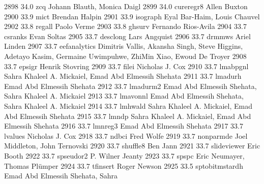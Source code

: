   2898     34.0    zcq           Johann Blauth, Monica Daigl             
  2899     34.0    cureregr8     Allen Buxton                            
  2900     33.9    mict          Brendan Halpin                          
  2901     33.9    isograph      Eyal Bar-Haim, Louis Chauvel            
  2902     33.8    regall        Paolo Verme                             
  2903     33.8    ghsurv        Fernando Rios-Avila                     
  2904     33.7    csranks       Evan Soltas                             
  2905     33.7    desclong      Lars Angquist                           
  2906     33.7    drmmws        Ariel Linden                            
  2907     33.7    eefanalytics  Dimitris Vallis, Akansha Singh, Steve   
                                   Higgins, Adetayo Kasim, Germaine        
                                   Uwimpuhwe, ZhiMin Xiao, Ewoud De Troyer 
  2908     33.7    epsigr        Henrik Stovring                         
  2909     33.7    filei         Nicholas J. Cox                         
  2910     33.7    lmabpgnl      Sahra Khaleel A. Mickaiel, Emad Abd     
                                   Elmessih Shehata                        
  2911     33.7    lmadurh       Emad Abd Elmessih Shehata               
  2912     33.7    lmadurm2      Emad Abd Elmessih Shehata, Sahra        
                                   Khaleel A. Mickaiel                     
  2913     33.7    lmavonnl      Emad Abd Elmessih Shehata, Sahra        
                                   Khaleel A. Mickaiel                     
  2914     33.7    lmhwald       Sahra Khaleel A. Mickaiel, Emad Abd     
                                   Elmessih Shehata                        
  2915     33.7    lmndp         Sahra Khaleel A. Mickaiel, Emad Abd     
                                   Elmessih Shehata                        
  2916     33.7    lmnreg3       Emad Abd Elmessih Shehata               
  2917     33.7    lvalues       Nicholas J. Cox                         
  2918     33.7    ndbci         Fred Wolfe                              
  2919     33.7    nonparmde     Joel Middleton, John Ternovski          
  2920     33.7    shuffle8      Ben Jann                                
  2921     33.7    slideviewer   Eric Booth                              
  2922     33.7    spseudor2     P. Wilner Jeanty                        
  2923     33.7    spspc         Eric Neumayer, Thomas Plümper          
  2924     33.7    tfinsert      Roger Newson                            
  2925     33.5    sptobitmstardh  Emad Abd Elmessih Shehata, Sahra        
